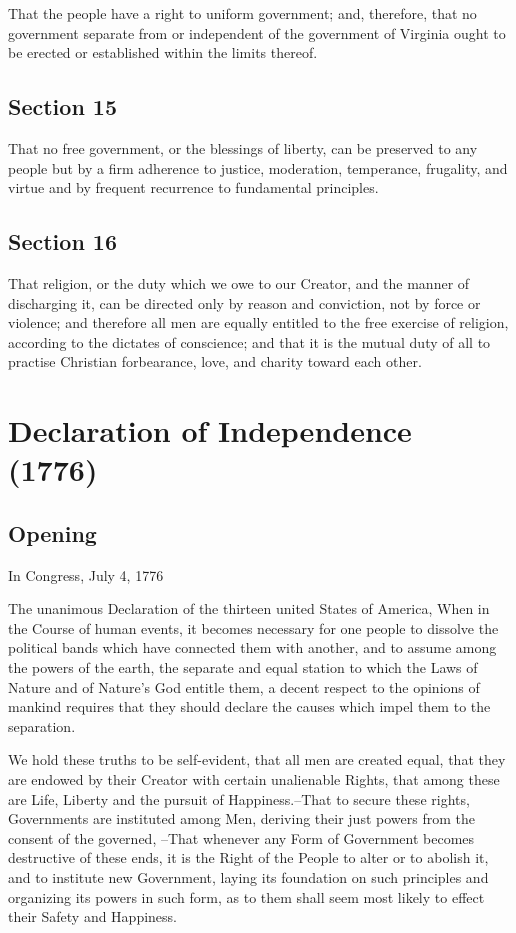 \documentclass[11pt,a4paper]{article}
\begin{document}
That the people have a right to uniform government; and, therefore, that no government separate from or independent of the government of Virginia ought to be erected or established within the limits thereof.

\subsection*{Section 15}

That no free government, or the blessings of liberty, can be preserved to any people but by a firm adherence to justice, moderation, temperance, frugality, and virtue and by frequent recurrence to fundamental principles.

\subsection*{Section 16}

That religion, or the duty which we owe to our Creator, and the manner of discharging it, can be directed only by reason and conviction, not by force or violence; and therefore all men are equally entitled to the free exercise of religion, according to the dictates of conscience; and that it is the mutual duty of all to practise Christian forbearance, love, and charity toward each other.

\section*{Declaration of Independence (1776)}

\subsection*{Opening}

In Congress, July 4, 1776

The unanimous Declaration of the thirteen united States of America, When in the Course of human events, it becomes necessary for one people to dissolve the political bands which have connected them with another, and to assume among the powers of the earth, the separate and equal station to which the Laws of Nature and of Nature's God entitle them, a decent respect to the opinions of mankind requires that they should declare the causes which impel them to the separation.

We hold these truths to be self-evident, that all men are created equal, that they are endowed by their Creator with certain unalienable Rights, that among these are Life, Liberty and the pursuit of Happiness.--That to secure these rights, Governments are instituted among Men, deriving their just powers from the consent of the governed, --That whenever any Form of Government becomes destructive of these ends, it is the Right of the People to alter or to abolish it, and to institute new Government, laying its foundation on such principles and organizing its powers in such form, as to them shall seem most likely to effect their Safety and Happiness.
\end{document}

